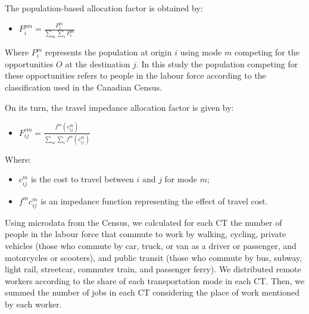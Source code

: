 \documentclass[preprint, 3p,
authoryear]{elsarticle} %
\providecommand{\tightlist}{%
  \setlength{\itemsep}{0pt}\setlength{\parskip}{0pt}}
\begin{document}
The population-based allocation factor is obtained by:

\begin{itemize}
\tightlist
\item
  \(F^{pm}_{i} = \frac{P_{i}^m}{\sum_{m}\sum_{i} P_{i}^m}\)
\end{itemize}

Where \(P_{i}^m\) represents the population at origin \(i\) using mode
\(m\) competing for the opportunities \(O\) at the destination \(j\). In
this study the population competing for these opportunities refers to
people in the labour force according to the classification used in the
Canadian Census.

On its turn, the travel impedance allocation factor is given by:

\begin{itemize}
\tightlist
\item
  \(F_{ij}^{cm} = \frac{f^m(c_{ij}^m)}{\sum_{m} \sum_{i} f^m(c_{ij}^m)}\)
\end{itemize}

Where:

\begin{itemize}
\tightlist
\item
  \(c^m_{ij}\) is the cost to travel between \(i\) and \(j\) for mode
  \(m\);
\item
  \(f^m{c^m_{ij}}\) is an impedance function representing the effect of
  travel cost.
\end{itemize}

Using microdata from the Census, we calculated for each CT the number of
people in the labour force that commute to work by walking, cycling,
private vehicles (those who commute by car, truck, or van as a driver or
passenger, and motorcycles or scooters), and public transit (those who
commute by bus, subway, light rail, streetcar, commuter train, and
passenger ferry). We distributed remote workers according to the share
of each transportation mode in each CT. Then, we summed the number of
jobs in each CT considering the place of work mentioned by each worker.
\end{document}

